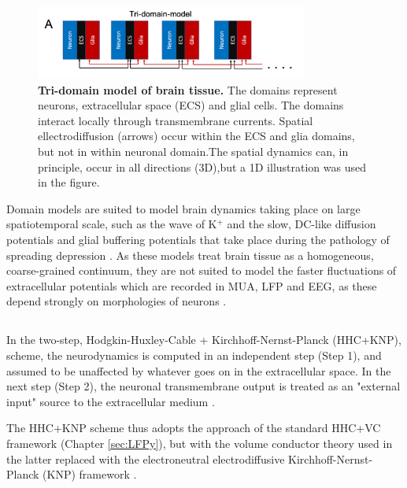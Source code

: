 \begin{figure}[!ht]
\begin{center}
\includegraphics[width=0.8\textwidth]{Figures/Schemes/Tridomain.png}
\end{center}
\caption{\textbf{Tri-domain model of brain tissue.} The domains represent neurons, extracellular space (ECS) and glial cells. The domains interact locally through transmembrane currents. Spatial ellectrodiffusion (arrows) occur within the ECS and glia domains, but not in within neuronal domain.The spatial dynamics can, in principle, occur in all directions (3D),but a 1D illustration was used in the figure. 
}
\label{Schemes:fig:domainmodel}
\end{figure}

Domain models are suited to model brain dynamics taking place on large spatiotemporal scale, such as the wave of K$^+$ and the slow, DC-like diffusion potentials and glial buffering potentials that take place during the pathology of spreading depression \citep{Mori2015, OConnell2016, tuttle2019}. As these models treat brain tissue as a homogeneous, coarse-grained continuum, they are not suited to model the faster fluctuations of extracellular potentials which are recorded in MUA, LFP and EEG, as these depend strongly on morphologies of neurons \citep{Einevoll2013}. 



\subsection{}
\label{sec:Schemes:KNP}
In the two-step, Hodgkin-Huxley-Cable + Kirchhoff-Nernst-Planck (HHC+KNP), scheme, the neurodynamics is computed in an independent step (Step 1), and assumed to be unaffected by whatever goes on in the extracellular space. In the next step (Step 2), the neuronal transmembrane output is treated as an "external input" source to the extracellular medium \citep{Halnes2016, Solbra2018}. 

The HHC+KNP scheme thus adopts the approach of the standard HHC+VC framework (Chapter \ref{sec:LFPy}), but with the volume conductor theory used in the latter replaced with the electroneutral electrodiffusive Kirchhoff-Nernst-Planck (KNP) framework \citep{Halnes2016, Solbra2018, ellingsrud2020}. 

